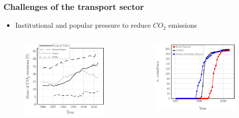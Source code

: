 \documentclass[first,firstsupp,lastsupp,last,hyperref,table]{ETHclass}
\begin{document}
\begin{frame}
\frametitle{Challenges of the transport sector}
\vspace{-0.5cm}
\centering
\begin{itemize}[label=]
\item Institutional and popular pressure to reduce $CO_{2}$ emissions
\end{itemize}
\begin{columns}[c]
\begin{column}{0.5\textwidth}
\centering
\begin{figure}
\centering
\includegraphics[width=\columnwidth]{co2transportshare.pdf}
\end{figure}
\end{column}
\begin{column}{0.5\textwidth}
\centering
\begin{figure}
\centering
\includegraphics[width=\columnwidth]{climate-deals-signataries.pdf}
\end{figure}
\end{column}
\end{columns}
\end{frame}
\end{document}
